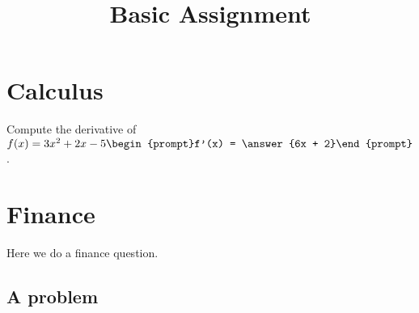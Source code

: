 \documentclass[noauthor,nooutcomes]{ximera}
\title{Basic Assignment}
\renewcommand{\alt}[1]{\vadjust{\todo{#1}}}
\begin{document}
\begin{abstract}
\end{abstract}
\maketitle


\section{Calculus}

\begin{problem}
  Compute the derivative of $f(x) = 3x^2 + 2x - 5 %
  \begin{prompt}f'(x) = \answer{6x + 2}%
  \end{prompt}$.
\end{problem}

\section{Finance}

Here we do a finance question.

\subsection{A problem}
\end{document}
